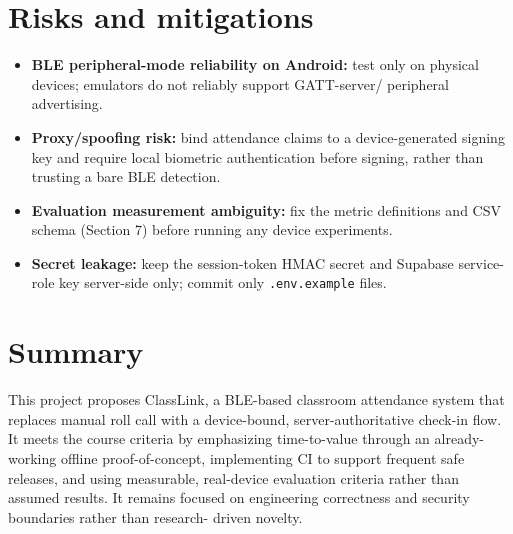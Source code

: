 \documentclass[11pt,a4paper]{article}
\begin{document}
\section{Risks and mitigations}
\begin{itemize}[leftmargin=0.7cm]
    \item \textbf{BLE peripheral-mode reliability on Android:} test only
    on physical devices; emulators do not reliably support GATT-server/
    peripheral advertising.
    \item \textbf{Proxy/spoofing risk:} bind attendance claims to a
    device-generated signing key and require local biometric
    authentication before signing, rather than trusting a bare BLE
    detection.
    \item \textbf{Evaluation measurement ambiguity:} fix the metric
    definitions and CSV schema (Section 7) before running any device
    experiments.
    \item \textbf{Secret leakage:} keep the session-token HMAC secret and
    Supabase service-role key server-side only; commit only
    \texttt{.env.example} files.
\end{itemize}

\section{Summary}
This project proposes ClassLink, a BLE-based classroom attendance system
that replaces manual roll call with a device-bound, server-authoritative
check-in flow. It meets the course criteria by emphasizing time-to-value
through an already-working offline proof-of-concept, implementing CI to
support frequent safe releases, and using measurable, real-device
evaluation criteria rather than assumed results. It remains focused on
engineering correctness and security boundaries rather than research-
driven novelty.
\end{document}
